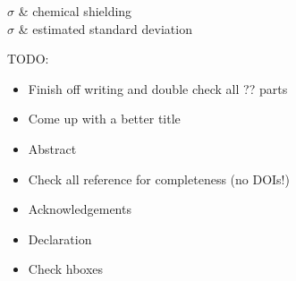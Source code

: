 \documentclass[a4paper, 12pt]{Thesis}  %
\begin{document}
\begin{comment}
\listofsymbols{ll}  %
{
\textbf{LAH} & \textbf{L}ist \textbf{A}bbreviations \textbf{H}ere \\

}

\clearpage  %
\listofconstants{lrcl}  %
{
Speed of Light & $c$ & $=$ & $2.997\ 924\ 58\times10^{8}\ \mbox{ms}^{-\mbox{s}}$ (exact)\\

}
\end{comment}
\clearpage  %
{
$\sigma$ & chemical shielding\\
$\sigma$ & estimated standard deviation\\
}

\clearpage
\ttfamily
TODO:
\begin{itemize}
  \item Finish off writing and double check all ?? parts
  \item Come up with a better title
  \item Abstract
  \item Check all reference for completeness (no DOIs!)
  \item Acknowledgements
  \item Declaration
  \item Check hboxes
\end{itemize}
\normalfont
\mainmatter	  %
\pagestyle{fancy}  %
\end{document}
